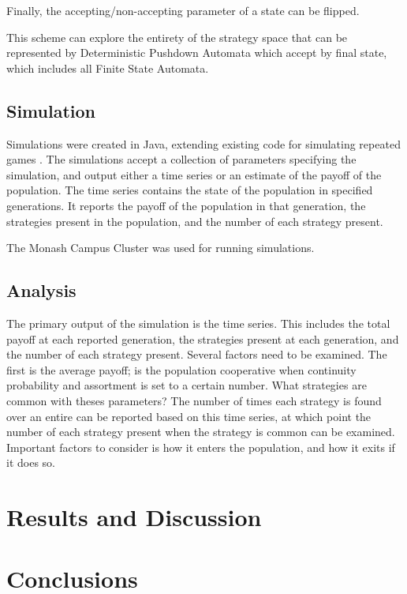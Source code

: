 \documentclass[a4paper,11pt,bcshonoursthesis,singlespace,twoside,thesisdraft,pdflatex]{cssethesis}
\begin{document}
Finally, the accepting/non-accepting parameter of a state can be flipped.

This scheme can explore the entirety of the strategy space that can be represented by Deterministic Pushdown Automata which accept by final state, which includes all Finite State Automata.
\section{Simulation}
Simulations were created in Java, extending existing code for simulating repeated games \citep{jggit}. 
The simulations accept a collection of parameters specifying the simulation, and output either a time series or an estimate of the payoff of the population. 
The time series contains the state of the population in specified generations. 
It reports the payoff of the population in that generation, the strategies present in the population, and the number of each strategy present. 


The Monash Campus Cluster \citep{cluster} was used for running simulations. 

\section{Analysis}
The primary output of the simulation is the time series. 
This includes the total payoff at each reported generation, the strategies present at each generation, and the number of each strategy present. 
Several factors need to be examined. The first is the average payoff; is the population cooperative when continuity probability and assortment is set to a certain number. 
What strategies are common with theses parameters? 
The number of times each strategy is found over an entire can be reported based on this time series, at which point the number of each strategy present when the strategy is common can be examined. Important factors to consider is how it enters the population, and how it exits if it does so. 

\chapter{Results and Discussion}

\chapter{Conclusions}

\appendix %
\end{document}
